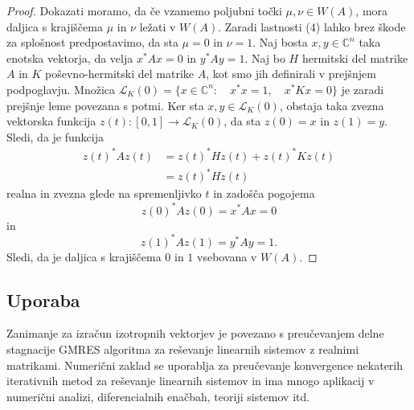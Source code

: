 \documentclass[12pt,a4paper]{amsart}
\theoremstyle{definition}
\theoremstyle{plain}
\newcommand{\LH}{\mathcal{L}}
\newcommand{\C}{\mathbb C}
\begin{document}
\begin{proof}
Dokazati moramo, da če vzamemo poljubni točki $\mu, \nu \in W(A)$,  mora daljica s krajiščema $\mu$ in $\nu$ ležati v $W(A)$. Zaradi lastnosti (4) lahko brez škode za splošnost predpostavimo, da sta $\mu=0$ in $\nu=1$. Naj bosta $x,y\in \C^n$ taka enotska vektorja, da velja $x^\ast Ax=0$ in $y^\ast Ay=1$. 
Naj bo $H$ hermitski del matrike $A$ in $K$ poševno-hermitski del matrike $A$, kot smo jih definirali v prejšnjem podpoglavju. Množica $\LH_{K}(0) =\{x\in \C^n:\quad x^\ast x=1,\quad x^\ast Kx=0\}$ je zaradi prejšnje leme povezana s potmi. Ker sta $x,y\in \LH_{K}(0)$, obstaja taka zvezna vektorska funkcija $z(t): [0,1] \rightarrow \LH_{K}(0)$, da sta $z(0)=x$ in $z(1)=y$.  Sledi, da je funkcija 
\begin{align*}
z(t)^\ast A z(t) &= z(t)^\ast Hz(t) +z(t)^\ast K z(t) \\
 &= z(t)^\ast Hz(t)
\end{align*}
realna in zvezna glede na spremenljivko $t$ in zadošča pogojema $$z(0)^\ast Az(0)=x^\ast Ax=0$$ in $$z(1)^\ast Az(1)=y^\ast Ay=1.$$ Sledi, da je daljica s krajiščema $0$ in $1$ vsebovana v $W(A)$.
\end{proof}

\subsection{Uporaba}
Zanimanje za izračun izotropnih vektorjev je povezano s pre\-u\-če\-va\-njem delne stagnacije GMRES algoritma za reševanje linearnih sistemov z realnimi matrikami. Numerični zaklad se uporablja za preučevanje konvergence nekaterih iterativnih metod za reševanje linearnih sistemov in ima mnogo aplikacij v numerični analizi, diferencialnih enačbah, teoriji sistemov itd.
\end{document}
